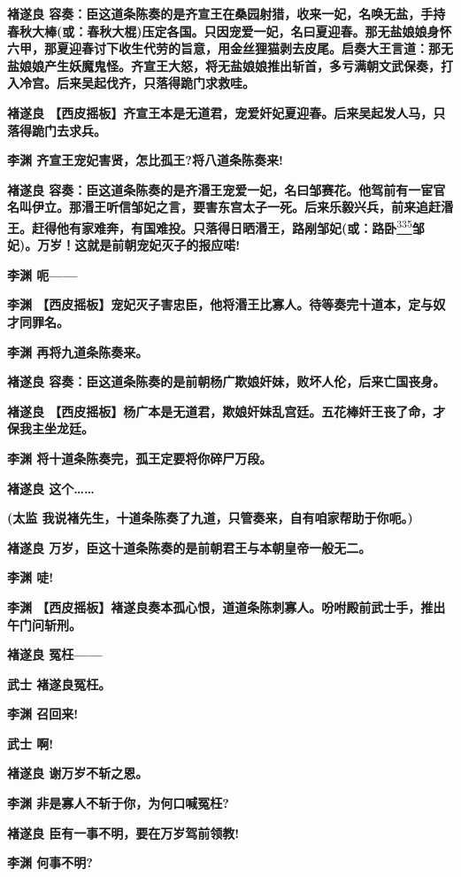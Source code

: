 \textbf{褚遂良
容奏：臣这道条陈奏的是齐宣王在桑园射猎，收来一妃，名唤无盐，手持春秋大棒(或：春秋大棍)压定各国。只因宠爱一妃，名曰夏迎春。那无盐娘娘身怀六甲，那夏迎春讨下收生代劳的旨意，用金丝狸猫剥去皮尾。启奏大王言道：那无盐娘娘产生妖魔鬼怪。齐宣王大怒，将无盐娘娘推出斩首，多亏满朝文武保奏，打入冷宫。后来吴起伐齐，只落得跪门求救哇。}

\textbf{褚遂良
【西皮摇板】齐宣王本是无道君，宠爱奸妃夏迎春。后来吴起发人马，只落得跪门去求兵。}

\textbf{李渊 齐宣王宠妃害贤，怎比孤王?将八道条陈奏来!}

\textbf{褚遂良
容奏：臣这道条陈奏的是齐湣王宠爱一妃，名曰邹赛花。他驾前有一宦官名叫伊立。那湣王听信邹妃之言，要害东宫太子一死。后来乐毅兴兵，前来追赶湣王。赶得他有家难奔，有国难投。只落得日晒湣王，路剐邹妃(或：路卧}\protect\hyperlink{fn335}{\textsuperscript{335}}\textbf{邹妃)。万岁！这就是前朝宠妃灭子的报应喏!}

\textbf{李渊 呃------}

\textbf{李渊
【西皮摇板】宠妃灭子害忠臣，他将湣王比寡人。待等奏完十道本，定与奴才同罪名。}

\textbf{李渊 再将九道条陈奏来。}

\textbf{褚遂良
容奏：臣这道条陈奏的是前朝杨广欺娘奸妹，败坏人伦，后来亡国丧身。}

\textbf{褚遂良
【西皮摇板】杨广本是无道君，欺娘奸妹乱宫廷。五花棒奸王丧了命，才保我主坐龙廷。}

\textbf{李渊 将十道条陈奏完，孤王定要将你碎尸万段。}

\textbf{褚遂良 这个\ldots{}\ldots{}}

\textbf{(太监
我说褚先生，十道条陈奏了九道，只管奏来，自有咱家帮助于你呃。)}

\textbf{褚遂良 万岁，臣这十道条陈奏的是前朝君王与本朝皇帝一般无二。}

\textbf{李渊 唗!}

\textbf{李渊
【西皮摇板】褚遂良奏本孤心恨，道道条陈刺寡人。吩咐殿前武士手，推出午门问斩刑。}

\textbf{褚遂良 冤枉------}

\textbf{武士 褚遂良冤枉。}

\textbf{李渊 召回来!}

\textbf{武士 啊!}

\textbf{褚遂良 谢万岁不斩之恩。}

\textbf{李渊 非是寡人不斩于你，为何口喊冤枉?}

\textbf{褚遂良 臣有一事不明，要在万岁驾前领教!}

\textbf{李渊 何事不明?}

